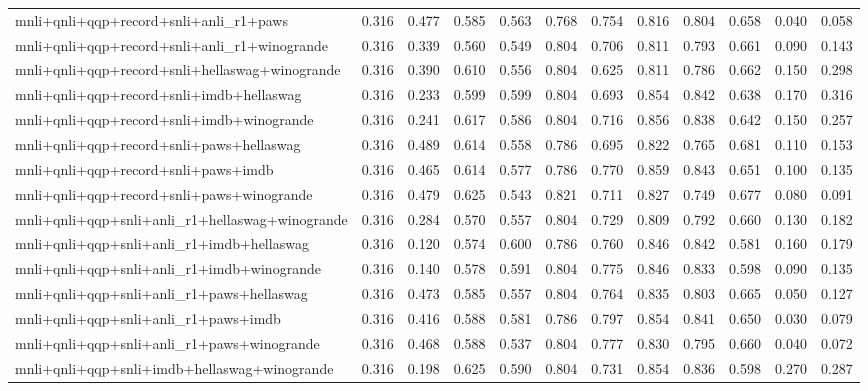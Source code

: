 \begin{table}[t]
\begin{tabular}{lrrrrrrrrrrr}
    mnli+qnli+qqp+record+snli+anli\_r1+paws & 0.316 & 0.477 & 0.585 & 0.563 & 0.768 & 0.754 & 0.816 & 0.804 & 0.658 & 0.040 & 0.058 \\
    mnli+qnli+qqp+record+snli+anli\_r1+winogrande & 0.316 & 0.339 & 0.560 & 0.549 & 0.804 & 0.706 & 0.811 & 0.793 & 0.661 & 0.090 & 0.143 \\
    mnli+qnli+qqp+record+snli+hellaswag+winogrande & 0.316 & 0.390 & 0.610 & 0.556 & 0.804 & 0.625 & 0.811 & 0.786 & 0.662 & 0.150 & 0.298 \\
    mnli+qnli+qqp+record+snli+imdb+hellaswag & 0.316 & 0.233 & 0.599 & 0.599 & 0.804 & 0.693 & 0.854 & 0.842 & 0.638 & 0.170 & 0.316 \\
    mnli+qnli+qqp+record+snli+imdb+winogrande & 0.316 & 0.241 & 0.617 & 0.586 & 0.804 & 0.716 & 0.856 & 0.838 & 0.642 & 0.150 & 0.257 \\
    mnli+qnli+qqp+record+snli+paws+hellaswag & 0.316 & 0.489 & 0.614 & 0.558 & 0.786 & 0.695 & 0.822 & 0.765 & 0.681 & 0.110 & 0.153 \\
    mnli+qnli+qqp+record+snli+paws+imdb & 0.316 & 0.465 & 0.614 & 0.577 & 0.786 & 0.770 & 0.859 & 0.843 & 0.651 & 0.100 & 0.135 \\
    mnli+qnli+qqp+record+snli+paws+winogrande & 0.316 & 0.479 & 0.625 & 0.543 & 0.821 & 0.711 & 0.827 & 0.749 & 0.677 & 0.080 & 0.091 \\
    mnli+qnli+qqp+snli+anli\_r1+hellaswag+winogrande & 0.316 & 0.284 & 0.570 & 0.557 & 0.804 & 0.729 & 0.809 & 0.792 & 0.660 & 0.130 & 0.182 \\
    mnli+qnli+qqp+snli+anli\_r1+imdb+hellaswag & 0.316 & 0.120 & 0.574 & 0.600 & 0.786 & 0.760 & 0.846 & 0.842 & 0.581 & 0.160 & 0.179 \\
    mnli+qnli+qqp+snli+anli\_r1+imdb+winogrande & 0.316 & 0.140 & 0.578 & 0.591 & 0.804 & 0.775 & 0.846 & 0.833 & 0.598 & 0.090 & 0.135 \\
    mnli+qnli+qqp+snli+anli\_r1+paws+hellaswag & 0.316 & 0.473 & 0.585 & 0.557 & 0.804 & 0.764 & 0.835 & 0.803 & 0.665 & 0.050 & 0.127 \\
    mnli+qnli+qqp+snli+anli\_r1+paws+imdb & 0.316 & 0.416 & 0.588 & 0.581 & 0.786 & 0.797 & 0.854 & 0.841 & 0.650 & 0.030 & 0.079 \\
    mnli+qnli+qqp+snli+anli\_r1+paws+winogrande & 0.316 & 0.468 & 0.588 & 0.537 & 0.804 & 0.777 & 0.830 & 0.795 & 0.660 & 0.040 & 0.072 \\
    mnli+qnli+qqp+snli+imdb+hellaswag+winogrande & 0.316 & 0.198 & 0.625 & 0.590 & 0.804 & 0.731 & 0.854 & 0.836 & 0.598 & 0.270 & 0.287 \\

\end{tabular}
\end{table}
